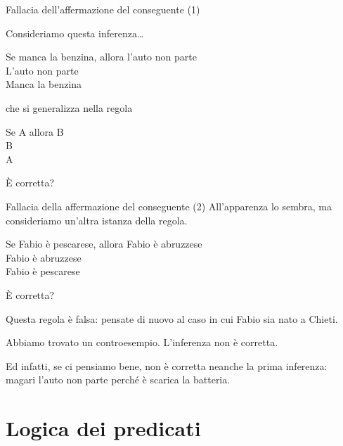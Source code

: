 \documentclass[10pt,dvipsnames]{beamer}
\begin{document}
\begin{frame}{Fallacia dell'affermazione del conseguente (1)}

	Consideriamo questa inferenza\ldots
	\begin{center}
		\begin{inference}
			Se manca la benzina, allora l'auto non parte\\
			L'auto non parte\\
			\hline
			Manca la benzina
		\end{inference}
	\end{center}
	che si generalizza nella regola
	\begin{center}
		\begin{inference}
			Se A allora B\\
			B\\
			\hline
			A
		\end{inference}
	\end{center}
	È corretta?
\end{frame}

\begin{frame}{Fallacia della affermazione del conseguente (2)}
	All'apparenza lo sembra, ma consideriamo un'altra istanza della regola.
	\begin{center}
		\begin{inference}
			Se Fabio è pescarese, allora Fabio è abruzzese\\
			Fabio è abruzzese\\
			\hline
			Fabio è pescarese
		\end{inference}
	\end{center}
	È corretta?

	\pause
	\medskip
	Questa regola è falsa: pensate di nuovo al caso in cui Fabio sia nato a Chieti.

	\medskip
	Abbiamo trovato un \alert{controesempio}. L'inferenza non è corretta.

	\medskip
	Ed infatti, se ci pensiamo bene, non è corretta neanche la prima inferenza: magari l'auto non parte perché è scarica la batteria.
\end{frame}


\section{Logica dei predicati}

\end{document}
